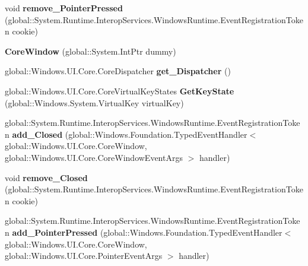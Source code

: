\begin{DoxyCompactItemize}
\item 
\mbox{\label{class_windows_1_1_u_i_1_1_core_1_1_core_window_a96f250810201c484ac490b1bcc7659cf}} 
void {\bfseries remove\+\_\+\+Pointer\+Pressed} (global\+::\+System.\+Runtime.\+Interop\+Services.\+Windows\+Runtime.\+Event\+Registration\+Token cookie)
\item 
\mbox{\label{class_windows_1_1_u_i_1_1_core_1_1_core_window_a482951fd8b0eed511b43c092a3931985}} 
{\bfseries Core\+Window} (global\+::\+System.\+Int\+Ptr dummy)
\item 
\mbox{\label{class_windows_1_1_u_i_1_1_core_1_1_core_window_a4782a27adee4d380d23689281fc88557}} 
global\+::\+Windows.\+U\+I.\+Core.\+Core\+Dispatcher {\bfseries get\+\_\+\+Dispatcher} ()
\item 
\mbox{\label{class_windows_1_1_u_i_1_1_core_1_1_core_window_ade3fe1967e403778223e3236e0c503f3}} 
global\+::\+Windows.\+U\+I.\+Core.\+Core\+Virtual\+Key\+States {\bfseries Get\+Key\+State} (global\+::\+Windows.\+System.\+Virtual\+Key virtual\+Key)
\item 
\mbox{\label{class_windows_1_1_u_i_1_1_core_1_1_core_window_a961d684ac08b8daaba0ae932995c1a06}} 
global\+::\+System.\+Runtime.\+Interop\+Services.\+Windows\+Runtime.\+Event\+Registration\+Token {\bfseries add\+\_\+\+Closed} (global\+::\+Windows.\+Foundation.\+Typed\+Event\+Handler$<$ global\+::\+Windows.\+U\+I.\+Core.\+Core\+Window, global\+::\+Windows.\+U\+I.\+Core.\+Core\+Window\+Event\+Args $>$ handler)
\item 
\mbox{\label{class_windows_1_1_u_i_1_1_core_1_1_core_window_aa0cf80ef7200e08c7924a163be3833cf}} 
void {\bfseries remove\+\_\+\+Closed} (global\+::\+System.\+Runtime.\+Interop\+Services.\+Windows\+Runtime.\+Event\+Registration\+Token cookie)
\item 
\mbox{\label{class_windows_1_1_u_i_1_1_core_1_1_core_window_a40ea0111f6284c33ba8550a4473ce2cd}} 
global\+::\+System.\+Runtime.\+Interop\+Services.\+Windows\+Runtime.\+Event\+Registration\+Token {\bfseries add\+\_\+\+Pointer\+Pressed} (global\+::\+Windows.\+Foundation.\+Typed\+Event\+Handler$<$ global\+::\+Windows.\+U\+I.\+Core.\+Core\+Window, global\+::\+Windows.\+U\+I.\+Core.\+Pointer\+Event\+Args $>$ handler)

\end{DoxyCompactItemize}

